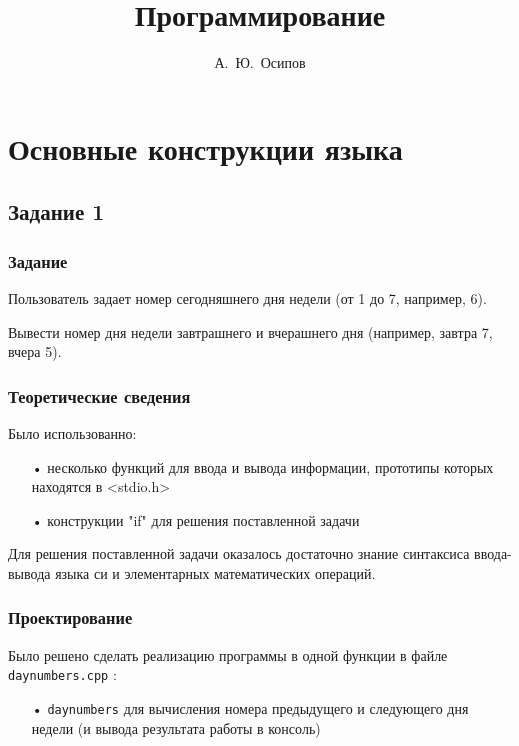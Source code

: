 \documentclass[12pt,a4paper]{report}
\author{А.~Ю.~Осипов}
\title{Программирование}
\begin{document}
\maketitle
\tableofcontents{}
\chapter{Основные конструкции языка}
\section{Задание 1}
\subsection{Задание}
Пользователь задает номер сегодняшнего дня недели (от 1 до 7, например, 6).

Вывести номер дня недели завтрашнего и вчерашнего дня (например, завтра 7, вчера 5).
\subsection{Теоретические сведения}

Было использованно:
\begin{enumerate}
\item[•] несколько функций для ввода и вывода информации, прототипы которых находятся в <stdio.h>
\item[•] конструкции "if" для решения поставленной задачи
\end{enumerate}

Для решения поставленной задачи оказалось достаточно знание синтаксиса ввода-вывода языка си и элементарных математических операций.


\subsection{Проектирование}

Было решено сделать реализацию программы в одной функции в файле \verb-daynumbers.cpp- :
\begin{enumerate}
\item[•]  \verb-daynumbers- для вычисления номера предыдущего и следующего дня недели (и вывода результата работы в консоль)

\end{enumerate}
\end{document}

